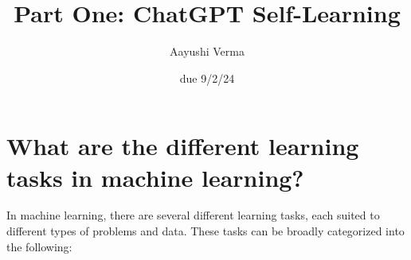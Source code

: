 \documentclass{article}
\title{Part One: ChatGPT Self-Learning}
\author{Aayushi Verma}
\date{due 9/2/24}
\begin{document}
\maketitle


\section{What are the different learning tasks in machine learning?}
In machine learning, there are several different learning tasks, each suited to different types of problems and data. These tasks can be broadly categorized into the following:
\end{document}
